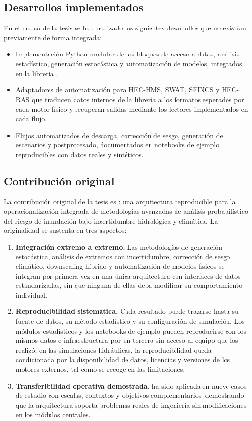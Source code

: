 \subsection*{Desarrollos implementados}

En el marco de la tesis se han realizado los siguientes desarrollos que no existían previamente de forma integrada:

\begin{itemize}
  \item Implementación Python modular de los bloques de acceso a datos, análisis estadístico, generación estocástica y automatización de modelos, integrados en la librería \pyhydra.
  \item Adaptadores de automatización para HEC-HMS, SWAT, SFINCS y HEC-RAS que traducen datos internos de la librería a los formatos esperados por cada motor físico y recuperan salidas mediante los lectores implementados en cada flujo.
  \item Flujos automatizados de descarga, corrección de sesgo, generación de escenarios y postprocesado, documentados en notebooks de ejemplo reproducibles con datos reales y sintéticos.
\end{itemize}

\subsection*{Contribución original}

La contribución original de la tesis es \hydra: una arquitectura reproducible para la operacionalización integrada de metodologías avanzadas de análisis probabilístico del riesgo de inundación bajo incertidumbre hidrológica y climática. La originalidad se sustenta en tres aspectos:

\begin{enumerate}
  \item \textbf{Integración extremo a extremo.} Las metodologías de generación estocástica, análisis de extremos con incertidumbre, corrección de sesgo climático, downscaling híbrido y automatización de modelos físicos se integran por primera vez en una única arquitectura con interfaces de datos estandarizadas, sin que ninguna de ellas deba modificar su comportamiento individual.
  \item \textbf{Reproducibilidad sistemática.} Cada resultado puede trazarse hasta su fuente de datos, su método estadístico y su configuración de simulación. Los módulos estadísticos y los notebooks de ejemplo pueden reproducirse con los mismos datos e infraestructura por un tercero sin acceso al equipo que los realizó; en las simulaciones hidráulicas, la reproducibilidad queda condicionada por la disponibilidad de datos, licencias y versiones de los motores externos, tal como se recoge en las limitaciones.
  \item \textbf{Transferibilidad operativa demostrada.} \hydra ha sido aplicada en nueve casos de estudio con escalas, contextos y objetivos complementarios, demostrando que la arquitectura soporta problemas reales de ingeniería sin modificaciones en los módulos centrales.
\end{enumerate}

